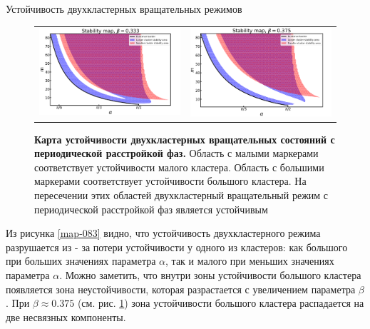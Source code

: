 \begin{chapter}{Устойчивость двухкластерных вращательных режимов}
	\begin{figure}[h!]\center
		\begin{tabular}{cc}
		\includegraphics[width=0.5\columnwidth]{pictures/map-0-33.png}
		&
		\includegraphics[width=0.5\columnwidth]{pictures/map-0-375.png}
		\end{tabular}
		\caption{\textbf{Карта устойчивости двухкластерных вращательных состояний с периодической расстройкой фаз.}
		Область с малыми маркерами соответствует устойчивости малого кластера.
		Область с большими маркерами соответствует устойчивости большого кластера.
		На пересечении этих областей двухкластерный вращательный режим с периодической расстройкой фаз является устойчивым}
		\label{map-0375}
	\end{figure}

	Из рисунка \ref{map-083} видно, что устойчивость двухкластерного режима разрушается из - за потери устойчивости у одного из кластеров:
	как большого при больших значениях параметра $\alpha$, так и малого при меньших значениях параметра $\alpha$.
	Можно заметить, что внутри зоны устойчивости большого кластера появляется зона неустойчивости, которая
	разрастается с увеличением параметра $\beta$. При $\beta \approx 0.375$ (см. рис. \ref{map-0375}) зона устойчивости большого кластера
	распадается на две несвязных компоненты.


\end{chapter}
